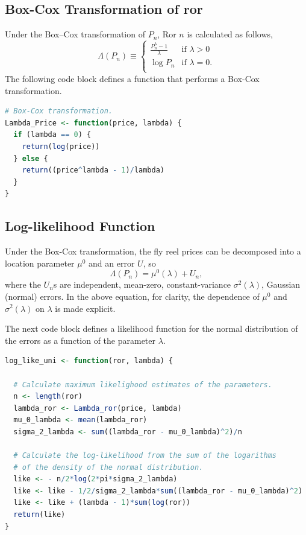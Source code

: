 \documentclass[11pt]{paper}
\begin{document}
\pagebreak
\clearpage

\subsection{Box-Cox Transformation of  ror}

Under the Box--Cox transformation of $P_n$, Ror $n$
is calculated as follows,
$$\Lambda(P_n)\equiv
  \begin{cases}
	\frac{P_n^\lambda-1}{\lambda}	& \textrm{if } \lambda > 0 \\
           \log P_n                     			& \textrm{if } \lambda = 0.\\
  \end{cases}
$$
The following code block defines a function that performs a
Box-Cox transformation.

\vspace{1.0in}







\begin{lstlisting}[language=R]
# Box-Cox transformation.
Lambda_Price <- function(price, lambda) {
  if (lambda == 0) {
    return(log(price))
  } else {
    return((price^lambda - 1)/lambda)
  }
}
\end{lstlisting}

\pagebreak
\subsection{Log-likelihood Function}

Under the Box-Cox transformation,
the fly reel prices can be decomposed into a location parameter $\mu^0$ 
and an error $U$, so
$$\Lambda(P_n) = \mu^0(\lambda) + U_n,$$
where the $U_n$s are independent, mean-zero, constant-variance 
$\sigma^2(\lambda)$, Gaussian (normal) errors. 
In the above equation, for clarity, the dependence of $\mu^0$ and 
$\sigma^2(\lambda)$ on $\lambda$ is made explicit.


The next code block defines a likelihood function for the normal distribution of the errors
as a function of the parameter $\lambda$.






\begin{lstlisting}[language=R]
log_like_uni <- function(ror, lambda) {

  # Calculate maximum likelighood estimates of the parameters.
  n <- length(ror)
  lambda_ror <- Lambda_ror(price, lambda)
  mu_0_lambda <- mean(lambda_ror)
  sigma_2_lambda <- sum((lambda_ror - mu_0_lambda)^2)/n

  # Calculate the log-likelihood from the sum of the logarithms
  # of the density of the normal distribution.
  like <- - n/2*log(2*pi*sigma_2_lambda)
  like <- like - 1/2/sigma_2_lambda*sum((lambda_ror - mu_0_lambda)^2)
  like <- like + (lambda - 1)*sum(log(ror))
  return(like)
}
\end{lstlisting}
\end{document}
